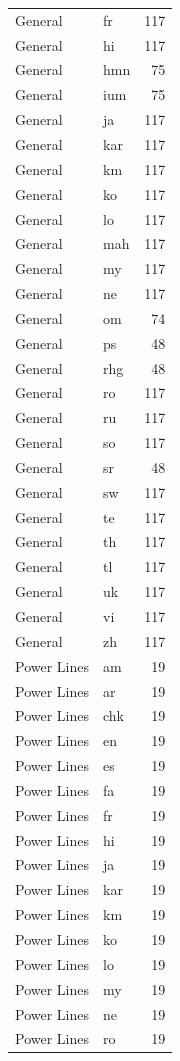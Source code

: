 \begin{longtable}{p{3cm} p{3cm} r}
General & fr & 117 \\
General & hi & 117 \\
General & hmn & 75 \\
General & ium & 75 \\
General & ja & 117 \\
General & kar & 117 \\
General & km & 117 \\
General & ko & 117 \\
General & lo & 117 \\
General & mah & 117 \\
General & my & 117 \\
General & ne & 117 \\
General & om & 74 \\
General & ps & 48 \\
General & rhg & 48 \\
General & ro & 117 \\
General & ru & 117 \\
General & so & 117 \\
General & sr & 48 \\
General & sw & 117 \\
General & te & 117 \\
General & th & 117 \\
General & tl & 117 \\
General & uk & 117 \\
General & vi & 117 \\
General & zh & 117 \\
Power Lines & am & 19 \\
Power Lines & ar & 19 \\
Power Lines & chk & 19 \\
Power Lines & en & 19 \\
Power Lines & es & 19 \\
Power Lines & fa & 19 \\
Power Lines & fr & 19 \\
Power Lines & hi & 19 \\
Power Lines & ja & 19 \\
Power Lines & kar & 19 \\
Power Lines & km & 19 \\
Power Lines & ko & 19 \\
Power Lines & lo & 19 \\
Power Lines & my & 19 \\
Power Lines & ne & 19 \\
Power Lines & ro & 19 \\

\end{longtable}
